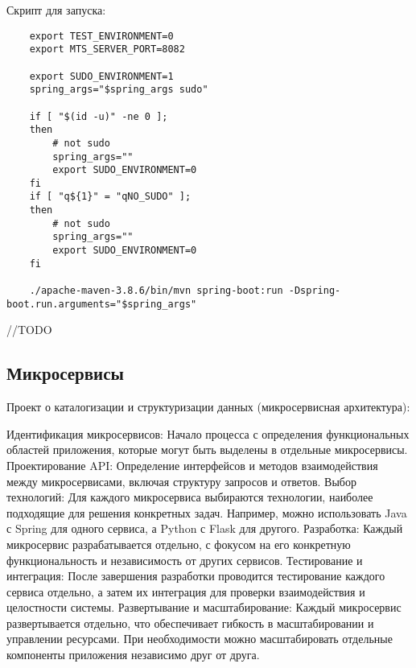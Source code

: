     Скрипт для запуска:
    \begin{lstlisting}
    export TEST_ENVIRONMENT=0
    export MTS_SERVER_PORT=8082
    
    export SUDO_ENVIRONMENT=1
    spring_args="$spring_args sudo"
    
    if [ "$(id -u)" -ne 0 ];
    then
        # not sudo
        spring_args=""
        export SUDO_ENVIRONMENT=0
    fi
    if [ "q${1}" = "qNO_SUDO" ];
    then
        # not sudo
        spring_args=""
        export SUDO_ENVIRONMENT=0
    fi
    
    ./apache-maven-3.8.6/bin/mvn spring-boot:run -Dspring-boot.run.arguments="$spring_args"
    \end{lstlisting}
    //TODO

\subsection{Микросервисы}
    Проект о каталогизации и структуризации данных (микросервисная архитектура):

    Идентификация микросервисов: Начало процесса с определения функциональных областей приложения, которые могут быть выделены в отдельные микросервисы.
    Проектирование API: Определение интерфейсов и методов взаимодействия между микросервисами, включая структуру запросов и ответов.
    Выбор технологий: Для каждого микросервиса выбираются технологии, наиболее подходящие для решения конкретных задач. Например, можно использовать Java с Spring для одного сервиса, а Python с Flask для другого.
    Разработка: Каждый микросервис разрабатывается отдельно, с фокусом на его конкретную функциональность и независимость от других сервисов.
    Тестирование и интеграция: После завершения разработки проводится тестирование каждого сервиса отдельно, а затем их интеграция для проверки взаимодействия и целостности системы.
    Развертывание и масштабирование: Каждый микросервис развертывается отдельно, что обеспечивает гибкость в масштабировании и управлении ресурсами. При необходимости можно масштабировать отдельные компоненты приложения независимо друг от друга.

